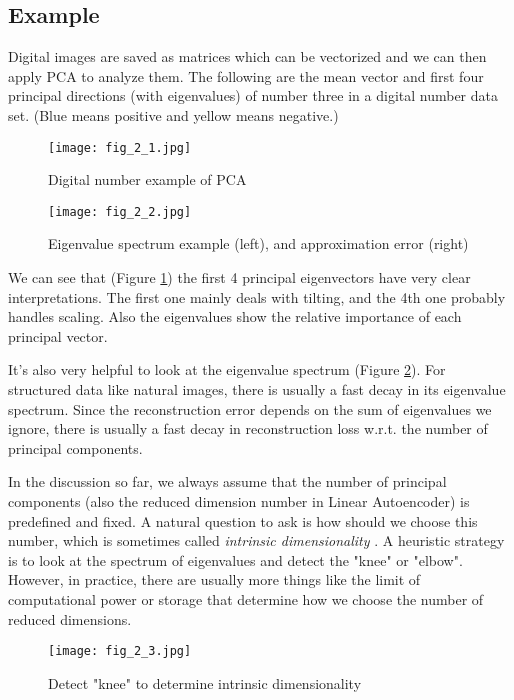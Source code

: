 \documentclass[../main.tex]{subfiles}
\begin{document}
\subsection{Example}
Digital images are saved as matrices which can be vectorized and we can then apply PCA to analyze them. The following are the mean vector and first four principal directions (with eigenvalues) of number three in a digital number data set. (Blue means positive and yellow means negative.)
\begin{figure}[h]
	\centering 
	\texttt{[image: fig\_2\_1.jpg]} 
	\caption{Digital number example of PCA}\label{fig_2_1}
\end{figure}
\begin{figure}[h] 
	\centering 
	\texttt{[image: fig\_2\_2.jpg]} 
	\caption{Eigenvalue spectrum example (left), and approximation error (right)}\label{fig_2_2}
\end{figure}
\par We can see that (Figure \ref{fig_2_1}) the first 4 principal eigenvectors have very clear interpretations. The first one mainly deals with tilting, and the 4th one probably handles scaling. Also the eigenvalues show the relative importance of each principal vector.
\par It's also very helpful to look at the eigenvalue spectrum (Figure \ref{fig_2_2}). For structured data like natural images, there is usually a fast decay in its eigenvalue spectrum. Since the reconstruction error depends on the sum of eigenvalues we ignore, there is usually a fast decay in reconstruction loss w.r.t. the number of principal components.
\par In the discussion so far, we always assume that the number of principal components (also the reduced dimension number in Linear Autoencoder) is predefined and fixed. A natural question to ask is how should we choose this number, which is sometimes called \emph{intrinsic dimensionality} . A heuristic strategy is to look at the spectrum of eigenvalues and detect the "knee" or "elbow". However, in practice, there are usually more things like the limit of computational power or storage that determine how we choose the number of reduced dimensions.
\begin{figure}[h] 
	\centering 
	\texttt{[image: fig\_2\_3.jpg]} 
	\caption{Detect "knee" to determine intrinsic dimensionality}\label{fig_2_3}
\end{figure}
\end{document}
